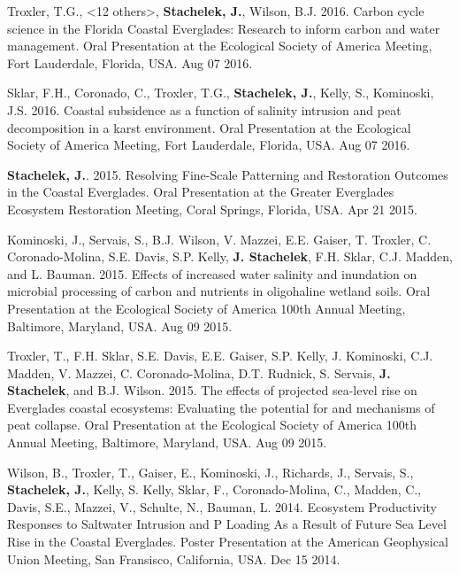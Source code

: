 \documentclass[11pt]{article}
\makeatletter
\newlength{\bibhang}
\newlength{\bibsep}
 {\@listi \global\bibsep\itemsep \global\advance\bibsep by\parsep}
\newenvironment{bibenum*}
  {\renewcommand\labelenumi{[\theenumi]}%
   \etaremune[
     topsep=0pt,
     itemsep=\bibsep,
     parsep=0pt,partopsep=0pt,
     itemindent=-\bibhang,
     leftmargin={\bibhang+\widthof{[999]}}]}
  {\endetaremune}
\makeatother
\begin{document}
\begin{bibenum*}
    \item Troxler, T.G., <12 others>, \textbf{Stachelek, J.}, Wilson, B.J. 2016. Carbon cycle science in the Florida Coastal Everglades: Research to inform carbon and water management. Oral Presentation at the Ecological Society of America Meeting, Fort Lauderdale, Florida, USA. Aug 07 2016.
%   
    \item Sklar, F.H., Coronado, C., Troxler, T.G., \textbf{Stachelek, J.}, Kelly, S., Kominoski, J.S. 2016. Coastal subsidence as a function of salinity intrusion and peat decomposition in a karst environment. Oral Presentation at the Ecological Society of America Meeting, Fort Lauderdale, Florida, USA. Aug 07 2016.
%   
    \item \textbf{Stachelek, J.}. 2015. Resolving Fine-Scale Patterning and Restoration Outcomes in the Coastal Everglades. Oral Presentation at the Greater Everglades Ecosystem Restoration Meeting, Coral Springs, Florida, USA. Apr 21 2015. %
%   
    \item Kominoski, J., Servais, S., B.J. Wilson, V. Mazzei, E.E. Gaiser, T. Troxler, C. Coronado-Molina, S.E. Davis, S.P. Kelly, \textbf{J. Stachelek}, F.H. Sklar, C.J. Madden, and L. Bauman. 2015. Effects of increased water salinity and inundation on microbial processing of carbon and nutrients in oligohaline wetland soils. Oral Presentation at the Ecological Society of America 100th Annual Meeting, Baltimore, Maryland, USA. Aug 09 2015.
%   
    \item Troxler, T., F.H. Sklar, S.E. Davis, E.E. Gaiser, S.P. Kelly, J. Kominoski, C.J. Madden, V. Mazzei, C. Coronado-Molina, D.T. Rudnick, S. Servais, \textbf{J. Stachelek}, and B.J. Wilson. 2015. The effects of projected sea-level rise on Everglades coastal ecosystems: Evaluating the potential for and mechanisms of peat collapse. Oral Presentation at the Ecological Society of America 100th Annual Meeting, Baltimore, Maryland, USA. Aug 09 2015.
%   
    \item Wilson, B., Troxler, T., Gaiser, E., Kominoski, J., Richards, J., Servais, S., \textbf{Stachelek, J.}, Kelly, S. Kelly, Sklar, F., Coronado-Molina, C., Madden, C., Davis, S.E., Mazzei, V., Schulte, N., Bauman, L. 2014. Ecosystem Productivity Responses to Saltwater Intrusion and P Loading As a Result of Future Sea Level Rise in the Coastal Everglades. Poster Presentation at the American Geophysical Union Meeting, San Fransisco, California, USA. Dec 15 2014.
   

\end{bibenum*}
\end{document}
